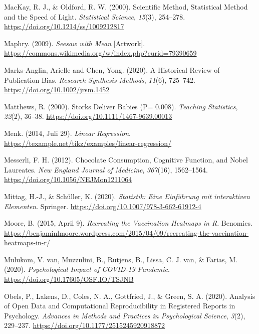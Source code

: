 \documentclass[
  letterpaper,
  twoside,
  open=any]{scrbook}
\newlength{\cslhangindent}
\newenvironment{CSLReferences}[2] %
 {\begin{list}{}{%
  \setlength{\itemindent}{0pt}
  \setlength{\leftmargin}{0pt}
  \setlength{\parsep}{0pt}
  \ifodd #1
   \setlength{\leftmargin}{\cslhangindent}
   \setlength{\itemindent}{-1\cslhangindent}
  \fi
  \setlength{\itemsep}{#2\baselineskip}}}
 {\end{list}}
\theoremstyle{definition}
\theoremstyle{definition}
\theoremstyle{definition}
\theoremstyle{remark}
\begin{document}
\begin{CSLReferences}{1}{0}
MacKay, R. J., \& Oldford, R. W. (2000). Scientific {Method},
{Statistical Method} and the {Speed} of {Light}. \emph{Statistical
Science}, \emph{15}(3), 254--278.
\url{https://doi.org/10.1214/ss/1009212817}

Maphry. (2009). \emph{Seesaw with Mean} {[}Artwork{]}.
\url{https://commons.wikimedia.org/w/index.php?curid=79390659}

Marks-Anglin, Arielle and Chen, Yong. (2020). A Historical Review of
Publication Bias. \emph{Research Synthesis Methods}, \emph{11}(6),
725--742. \url{https://doi.org/10.1002/jrsm.1452}

Matthews, R. (2000). Storks {Deliver Babies} (P= 0.008). \emph{Teaching
Statistics}, \emph{22}(2), 36--38.
\url{https://doi.org/10.1111/1467-9639.00013}

Menk. (2014, Juli 29). \emph{Linear Regression}.
\url{https://texample.net/tikz/examples/linear-regression/}

Messerli, F. H. (2012). Chocolate {Consumption}, {Cognitive Function},
and {Nobel Laureates}. \emph{New England Journal of Medicine},
\emph{367}(16), 1562--1564. \url{https://doi.org/10.1056/NEJMon1211064}

Mittag, H.-J., \& Schüller, K. (2020). \emph{Statistik: Eine Einführung
mit interaktiven Elementen}. Springer.
\url{https://doi.org/10.1007/978-3-662-61912-4}

Moore, B. (2015, April 9). \emph{Recreating the Vaccination Heatmaps in
{R}}. Benomics.
\url{https://benjaminlmoore.wordpress.com/2015/04/09/recreating-the-vaccination-heatmaps-in-r/}

Mulukom, V. van, Muzzulini, B., Rutjens, B., Lissa, C. J. van, \&
Farias, M. (2020). \emph{Psychological Impact of {COVID-19} Pandemic}.
\url{https://doi.org/10.17605/OSF.IO/TSJNB}

Obels, P., Lakens, D., Coles, N. A., Gottfried, J., \& Green, S. A.
(2020). Analysis of {Open Data} and {Computational Reproducibility} in
{Registered Reports} in {Psychology}. \emph{Advances in Methods and
Practices in Psychological Science}, \emph{3}(2), 229--237.
\url{https://doi.org/10.1177/2515245920918872}


\end{CSLReferences}
\end{document}
